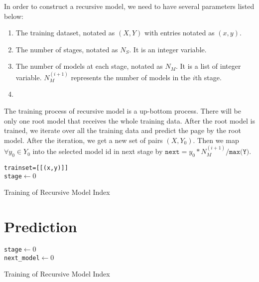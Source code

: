 In order to construct a recursive model, we need to have several parameters listed below:
\begin{enumerate}
	\item The training dataset, notated as $(X, Y)$ with entries notated as $(x,y)$.
	\item The number of stages, notated as $N_S$. It is an integer variable.
	\item The number of models at each stage, notated as $N_M$. It is a list of integer variable. $N_M^{(i+1)}$ represents the number of models in the $i$th stage.
	\item 
\end{enumerate}

The training process of recursive model is a up-bottom process. There will be only one root model that receives the whole training data. After the root model is trained, we iterate over all the training data and predict the page by the root model. After the iteration, we get a new set of pairs $(X, Y_0)$. Then we map $\forall y_0\in Y_0$ into the selected model id in next stage by $\texttt{next}=y_0 * N_M^{(i+1)}/\texttt{max(Y)}$.

\begin{algorithm}[H]
    \SetAlgoLined
     \texttt{trainset=[[(x,y)]]} \\
     \texttt{stage$\gets 0$} \\
     \caption{Training of Recursive Model Index}
\end{algorithm}

\section{Prediction}

\begin{algorithm}[H]
    \SetAlgoLined
     \texttt{stage$\gets 0$} \\
 	 \texttt{next\_model$\gets 0$} \\
     \caption{Training of Recursive Model Index}
\end{algorithm}
